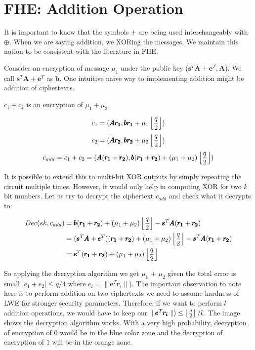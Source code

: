 \documentclass[usletter]{article}
\begin{document}
\section{FHE: Addition Operation}

\begin{remark}
    It is important to know that the symbols $+$ are being used interchangeably with $\oplus$. When we are saying addition, we XORing the messages. We maintain this notion to be consistent with the literature in FHE.
\end{remark}

Consider an encryption of message $\mu_1$ under the public key ($\pmb{s}^{T}\pmb{A} + \pmb{e}^{T}, \pmb{A}$). We call 
$\pmb{s}^{T}\pmb{A} + \pmb{e}^{T}$ as $\pmb{b}$. One intuitive naive way to implementing addition might be addition of ciphertexts.

\begin{claim}
    $c_1 + c_2$ is an encryption of $\mu_1 + \mu_2$
\end{claim}

$$c_1 = ( \pmb{Ar_1}, \pmb{br_1} + \mu_1\left\lfloor \frac{q}{2} \right\rfloor )$$
$$c_2 = ( \pmb{Ar_2}, \pmb{br_2} + \mu_2\left\lfloor \frac{q}{2} \right\rfloor )$$
$$c_{add} = c_1 + c_2 = ( \pmb{A}(\pmb{r_1} + \pmb{r_2}), \pmb{b}(\pmb{r_1} +\pmb{r_2}) + (\mu_1 + \mu_2)\left\lfloor \frac{q}{2} \right\rfloor )$$

It is possible to extend this to multi-bit XOR outputs by simply repeating the circuit multiple times. However, it would only help in computing XOR for two $k$ bit numbers. 
Let us try to decrypt the ciphertext $c_{add}$ and check what it decrypts to:

\begin{align*}
Dec(sk,c_{add})
&= \pmb{b}(\pmb{r_1} +\pmb{r_2}) + (\mu_1 + \mu_2)\left\lfloor \frac{q}{2} \right\rfloor-\pmb{s}^T\pmb{A}(\pmb{r_1} + \pmb{r_2})\\
&=(\pmb{s}^{T}\pmb{A} + \pmb{e}^{T})(\pmb{r_1} +\pmb{r_2}) + (\mu_1 + \mu_2)\left\lfloor \frac{q}{2} \right\rfloor-\pmb{s}^T\pmb{A}(\pmb{r_1} + \pmb{r_2})\\
&=\pmb{e}^{T}(\pmb{r_1} +\pmb{r_2}) + (\mu_1 + \mu_2)\left\lfloor \frac{q}{2} \right\rfloor
\end{align*}


So applying the decryption algorithm we get $\mu_1$ + $\mu_2$ given the total error
is small $|e_1 +e_2| \leq q/4$ where $e_i=\parallel\pmb{e}^{T}\pmb{r_i}\parallel$). The important observation to note here is to perform addition on 
two ciphertexts we need to assume hardness of LWE for stronger security parameters. 
Therefore, if we want to perform $l$ addition operations, we would have to keep our $\parallel\pmb{e}^{T}\pmb{r_i}\parallel) \leq \left\lfloor \frac{q}{2} \right\rfloor/l$. The image shows the decryption algorithm works. With a very high probability, decryption of encryption of $0$ would be in the blue color zone and the decryption of encryption of $1$ will be in the orange zone.
\end{document}
